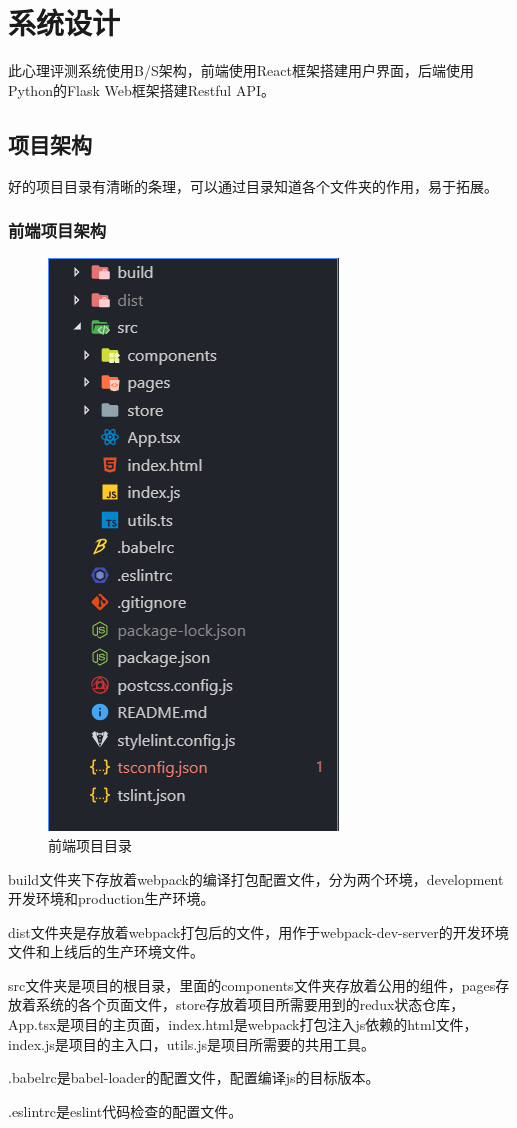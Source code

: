 \section{系统设计}
此心理评测系统使用B/S架构，前端使用React框架搭建用户界面，后端使用Python的Flask Web框架搭建Restful API。

\subsection{项目架构}

好的项目目录有清晰的条理，可以通过目录知道各个文件夹的作用，易于拓展。

\subsubsection{前端项目架构}
\begin{figure}[thbp!]
	\centering
	\includegraphics[width=0.3\linewidth]{figure/frontend_structure}
	\caption{前端项目目录}
	\label{fig:frontend_structure}
\end{figure}

build文件夹下存放着webpack的编译打包配置文件，分为两个环境，development开发环境和production生产环境。

dist文件夹是存放着webpack打包后的文件，用作于webpack-dev-server的开发环境文件和上线后的生产环境文件。

src文件夹是项目的根目录，里面的components文件夹存放着公用的组件，pages存放着系统的各个页面文件，store存放着项目所需要用到的redux状态仓库，App.tsx是项目的主页面，index.html是webpack打包注入js依赖的html文件，index.js是项目的主入口，utils.js是项目所需要的共用工具。

.babelrc是babel-loader的配置文件，配置编译js的目标版本。

.eslintrc是eslint代码检查的配置文件。

